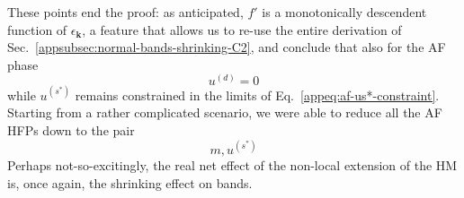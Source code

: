 These points end the proof: as anticipated, $f'$ is a monotonically descendent function of $\epsilon_\mathbf{k}$, a feature that allows us to re-use the entire derivation of Sec.~\ref{appsubsec:normal-bands-shrinking-C2}, and conclude that also for the AF phase
\[
	u^{(d)} = 0
\]
while $u^{(s^*)}$ remains constrained in the limits of Eq.~\eqref{appeq:af-us*-constraint}. Starting from a rather complicated scenario, we were able to reduce all the AF HFPs down to the pair
\[
	m, u^{(s^*)}
\]
Perhaps not-so-excitingly, the real net effect of the non-local extension of the HM is, once again, the shrinking effect on bands.